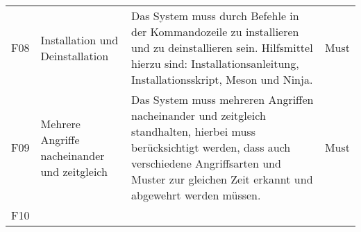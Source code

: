 \documentclass[../review_1.tex]{subfiles}
\begin{document}
\begin{longtable} [h] {p{1cm} p{4cm} p{7cm} l}
    F08                                                                                                                                                                                                              & Installation und Deinstallation                & Das System muss durch Befehle in der Kommandozeile zu installieren und zu deinstallieren sein. Hilfsmittel hierzu sind: Installationsanleitung, Installationsskript, Meson und Ninja.                                                                   & Must            \\
    F09                                                                                                                                                                                                              & Mehrere Angriffe nacheinander und zeitgleich & Das System muss mehreren Angriffen nacheinander und zeitgleich standhalten, hierbei muss berücksichtigt werden, dass auch verschiedene Angriffsarten und Muster zur gleichen Zeit erkannt und abgewehrt werden müssen.                                  & Must            \\
    F10
                    

\end{longtable}
\end{document}
